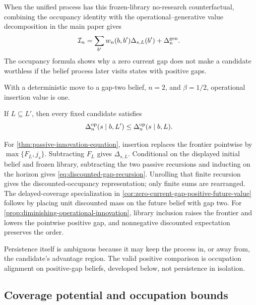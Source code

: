 When the unified process has this frozen-library no-research counterfactual,
combining the occupancy identity with the operational--generative value
decomposition in the main paper gives
\begin{equation}\label{eq:strategy-innovation-equation}
 \mathcal I_n
 =\sum_{b'}w_n(b,b')\Delta_{s,L}(b')
  +\Delta_n^{\mathrm{gen}}.
\end{equation}
The occupancy formula shows why a zero current gap does not make a candidate
worthless if the belief process later visits states with positive gaps.

\begin{corollary}
\label{cor:zero-current-gap-positive-future-value}
With a deterministic move to a gap-two belief, \(n=2\), and
\(\beta=1/2\), operational insertion value is one.
\end{corollary}

\begin{proposition}
\label{prop:diminishing-operational-innovation}
If \(L\subseteq L'\), then every fixed candidate satisfies
\[
 \Delta_n^{\mathrm{op}}(s\mid b,L')
 \le \Delta_n^{\mathrm{op}}(s\mid b,L).
\]
\end{proposition}

For \cref{thm:passive-innovation-equation}, insertion replaces the frontier
pointwise by \(\max\{F_L,j_s\}\).  Subtracting \(F_L\) gives
\(\Delta_{s,L}\).  Conditional on the displayed initial belief and frozen
library, subtracting the two passive recursions and inducting on the horizon
gives \eqref{eq:discounted-gap-recursion}.  Unrolling that finite recursion
gives the discounted-occupancy representation; only finite sums are
rearranged.  The delayed-coverage specialization in
\cref{cor:zero-current-gap-positive-future-value} follows by placing unit
discounted mass on the future belief with gap two.  For
\cref{prop:diminishing-operational-innovation}, library inclusion raises the
frontier and lowers the pointwise positive gap, and nonnegative discounted
expectation preserves the order.

Persistence itself is ambiguous because it may keep the process in, or away
from, the candidate's advantage region.  The valid positive comparison is
occupation alignment on positive-gap beliefs, developed below, not
persistence in isolation.

\subsection{Coverage potential and occupation bounds}

